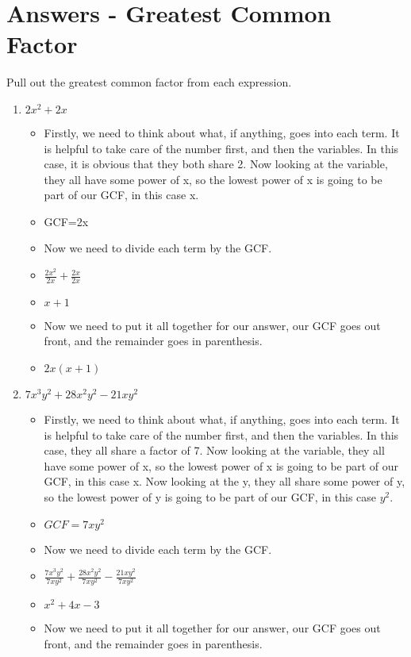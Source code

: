 \documentclass{article}
\begin{document}
\section{Answers - Greatest Common Factor}
Pull out the greatest common factor from each expression. \\
\begin{enumerate}
\item $2x^{2} + 2x$
  \begin{itemize}
  \item Firstly, we need to think about what, if anything, goes into each term. It is helpful to take care of the number first, and then the variables. In this case, it is obvious that they both share 2. Now looking at the variable, they all have some power of x, so the lowest power of x is going to be part of our GCF, in this case x.
  \item [] GCF=2x
  \item Now we need to divide each term by the GCF.
  \item [] {\Large $\frac{2x^{2}}{2x} + \frac{2x}{2x}$}
  \item [] $x+1$
  \item Now we need to put it all together for our answer, our GCF goes out front, and the remainder goes in parenthesis.
  \item $2x(x+1)$
  \end{itemize}
\item $7x^{3}y^{2} + 28x^{2}y^{2} - 21xy^{2}$
  \begin{itemize}
  \item Firstly, we need to think about what, if anything, goes into each term. It is helpful to take care of the number first, and then the variables. In this case, they all share a factor of 7. Now looking at the variable, they all have some power of x, so the lowest power of x is going to be part of our GCF, in this case x. Now looking at the y, they all share some power of y, so the lowest power of y is going to be part of our GCF, in this case $y^{2}$.
  \item [] $GCF=7xy^{2}$
  \item Now we need to divide each term by the GCF.
  \item [] {\Large $\frac{7x^{3}y^{2}}{7xy^{2}} + \frac{28x^{2}y^{2}}{7xy^{2}} - \frac{21xy^{2}}{7xy^{2}}$}
  \item [] $x^{2}+4x-3$
  \item Now we need to put it all together for our answer, our GCF goes out front, and the remainder goes in parenthesis.

\end{itemize}
\end{enumerate}
\end{document}
